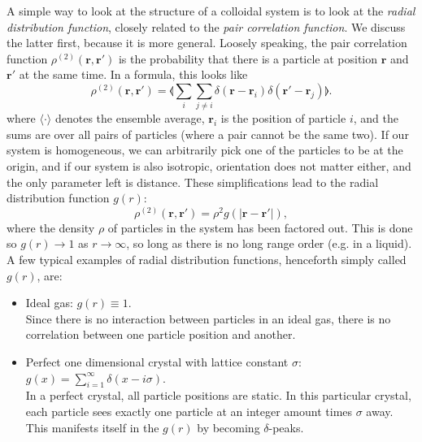 \documentclass[thesis]{subfiles}
\begin{document}
A simple way to look at the structure of a colloidal system is to look at the \emph{radial distribution function}, closely related to the \emph{pair correlation function}. We discuss the latter first, because it is more general. Loosely speaking, the pair correlation function $\rho^{(2)}(\bm r, \bm r')$ is the probability that there is a particle at position $\bm r$ and $\bm r'$ at the same time. In a formula, this looks like 
\begin{equation}
	\rho^{(2)}(\bm r, \bm r') = \llangle \sum_i \sum_{j \neq i} \delta(\bm r - \bm r_i) \delta(\bm r' - \bm r_j) \rrangle.
\end{equation}
where $\langle \cdot \rangle$ denotes the ensemble average, $\bm r_i$ is the position of particle $i$, and the sums are over all pairs of particles (where a pair cannot be the same two).
If our system is homogeneous, we can arbitrarily pick one of the particles to be at the origin, and if our system is also isotropic, orientation does not matter either, and the only parameter left is distance. These simplifications lead to the radial distribution function $g(r):$
\begin{equation}
	\rho^{(2)}(\bm r, \bm r') = \rho^2 g(|\bm r - \bm r'|),
\end{equation}
where the density $\rho$ of particles in the system has been factored out. This is done so $g(r) \rightarrow 1$ as $r \rightarrow \infty$, so long as there is no long range order (e.g. in a liquid). A few typical examples of radial distribution functions, henceforth simply called $g(r)$, are:


\begin{itemize}
	\item Ideal gas: $g(r) \equiv 1$.\\
	Since there is no interaction between particles in an ideal gas, there is no correlation between one particle position and another.
\begin{comment}
	\item Dilute gas of hard spheres of diameter $\sigma$: $g(r) = \begin{cases} 0 & \textrm{if } r < \sigma, \\ 1 & \textrm{else.} \end{cases}$\\
	Since hard spheres cannot overlap, we won't find any within one diameter of another (hence the $g(r)$ is zero there). But because the gas is dilute, there is very little interaction, and it'll be equally likely to find a sphere anywhere else.
\end{comment}
	\item Perfect one dimensional crystal with lattice constant $\sigma$: $g(x) = \sum_{i = 1}^\infty \delta(x - i\sigma)$.\\
	In a perfect crystal, all particle positions are static. In this particular crystal, each particle sees exactly one particle at an integer amount times $\sigma$ away. This manifests itself in the $g(r)$ by becoming $\delta$-peaks.
\end{itemize}
\end{document}
